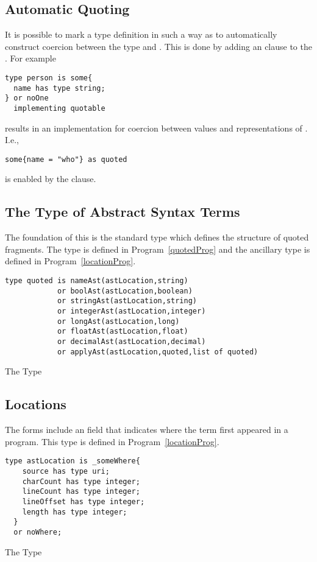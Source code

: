 \subsection{Automatic Quoting}
It is possible to mark a type definition in such a way as to automatically construct coercion between the type and . This is done by adding an  clause to the . For example
\begin{lstlisting}
type person is some{
  name has type string;
} or noOne 
  implementing quotable
\end{lstlisting}
results in an implementation for coercion between  values and  representations of . I.e., 
\begin{lstlisting}
some{name = "who"} as quoted
\end{lstlisting}
is enabled by the  clause.

\subsection{The Type of Abstract Syntax Terms}
The foundation of this is the standard  type which defines the structure of quoted fragments. The  type is defined in Program~\vref{quotedProg} and the ancillary type  is defined in Program~\vref{locationProg}.
\begin{program}
\begin{lstlisting}
type quoted is nameAst(astLocation,string)
            or boolAst(astLocation,boolean)
            or stringAst(astLocation,string)
            or integerAst(astLocation,integer)
            or longAst(astLocation,long)
            or floatAst(astLocation,float)
            or decimalAst(astLocation,decimal)
            or applyAst(astLocation,quoted,list of quoted)
\end{lstlisting}
\caption{The  Type\label{quotedProg}}
\end{program}

\subsection{Locations}
The  forms include an  field that indicates where the  term first appeared in a program. This type is defined in Program~\vref{locationProg}.
\begin{program}[htb]
\begin{lstlisting}
type astLocation is _someWhere{
    source has type uri;
    charCount has type integer;
    lineCount has type integer;
    lineOffset has type integer;
    length has type integer;
  }
  or noWhere;
\end{lstlisting}
\caption{The  Type\label{locationProg}}
\end{program}

